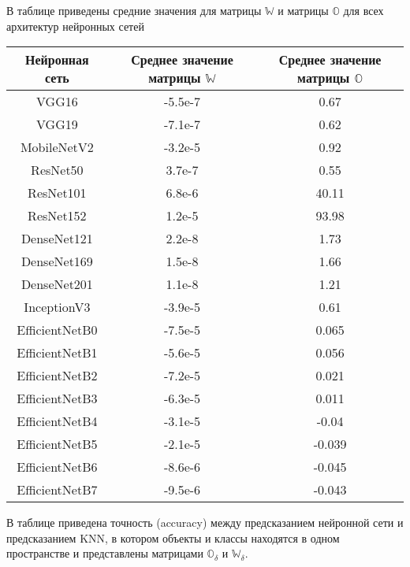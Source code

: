 \documentclass{article}
\begin{document}
В таблице приведены средние значения для матрицы $\mathbb{W}$ и матрицы $\mathbb{O}$ для всех архитектур нейронных сетей

\begin{center}
\begin{tabular}{ |c|c|c| } 
 \hline
 Нейронная сеть & Среднее значение матрицы $\mathbb{W}$ & Среднее значение матрицы $\mathbb{O}$ \\ 
 \hline
 \hline
 VGG16 & -5.5e-7 & 0.67 \\
 \hline
 VGG19 & -7.1e-7 & 0.62 \\
 \hline
 MobileNetV2 & -3.2e-5 & 0.92 \\
 \hline
 ResNet50 & 3.7e-7 & 0.55 \\
 \hline
 ResNet101 & 6.8e-6 & 40.11 \\
 \hline
 ResNet152 & 1.2e-5 & 93.98 \\
 \hline
 DenseNet121 & 2.2e-8 & 1.73 \\
 \hline
 DenseNet169 & 1.5e-8 & 1.66 \\
 \hline
 DenseNet201 & 1.1e-8 & 1.21 \\
 \hline
 InceptionV3 & -3.9e-5 & 0.61 \\
 \hline
 EfficientNetB0 & -7.5e-5 & 0.065 \\
 \hline
 EfficientNetB1 & -5.6e-5 & 0.056 \\
 \hline
 EfficientNetB2 & -7.2e-5 & 0.021 \\
 \hline
 EfficientNetB3 & -6.3e-5 & 0.011 \\
 \hline
 EfficientNetB4 & -3.1e-5 & -0.04 \\
 \hline
 EfficientNetB5 & -2.1e-5 & -0.039 \\
 \hline
 EfficientNetB6 & -8.6e-6 & -0.045 \\
 \hline
 EfficientNetB7 & -9.5e-6 & -0.043 \\
 \hline
\end{tabular}
\end{center}

\newpage

В таблице приведена точность (accuracy) между предсказанием нейронной сети и предсказанием KNN, в котором объекты и классы находятся в одном пространстве и представлены матрицами $\mathbb{O_\delta}$ и $\mathbb{W_\delta}$.
\end{document}
